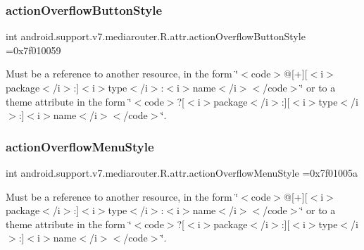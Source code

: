 \subsubsection{\texorpdfstring{action\+Overflow\+Button\+Style}{actionOverflowButtonStyle}}
{\footnotesize\ttfamily int android.\+support.\+v7.\+mediarouter.\+R.\+attr.\+action\+Overflow\+Button\+Style =0x7f010059\hspace{0.3cm}{\ttfamily [static]}}

Must be a reference to another resource, in the form \char`\"{}$<$code$>$@\mbox{[}+\mbox{]}\mbox{[}$<$i$>$package$<$/i$>$\+:\mbox{]}$<$i$>$type$<$/i$>$\+:$<$i$>$name$<$/i$>$$<$/code$>$\char`\"{} or to a theme attribute in the form \char`\"{}$<$code$>$?\mbox{[}$<$i$>$package$<$/i$>$\+:\mbox{]}\mbox{[}$<$i$>$type$<$/i$>$\+:\mbox{]}$<$i$>$name$<$/i$>$$<$/code$>$\char`\"{}. \mbox{\label{classandroid_1_1support_1_1v7_1_1mediarouter_1_1R_1_1attr_af6ab1d41c5f2da64e25b8346917871c8}} 
\subsubsection{\texorpdfstring{action\+Overflow\+Menu\+Style}{actionOverflowMenuStyle}}
{\footnotesize\ttfamily int android.\+support.\+v7.\+mediarouter.\+R.\+attr.\+action\+Overflow\+Menu\+Style =0x7f01005a\hspace{0.3cm}{\ttfamily [static]}}

Must be a reference to another resource, in the form \char`\"{}$<$code$>$@\mbox{[}+\mbox{]}\mbox{[}$<$i$>$package$<$/i$>$\+:\mbox{]}$<$i$>$type$<$/i$>$\+:$<$i$>$name$<$/i$>$$<$/code$>$\char`\"{} or to a theme attribute in the form \char`\"{}$<$code$>$?\mbox{[}$<$i$>$package$<$/i$>$\+:\mbox{]}\mbox{[}$<$i$>$type$<$/i$>$\+:\mbox{]}$<$i$>$name$<$/i$>$$<$/code$>$\char`\"{}. \mbox{\label{classandroid_1_1support_1_1v7_1_1mediarouter_1_1R_1_1attr_afffef61df88a3a95b368b88b417477ae}} 
